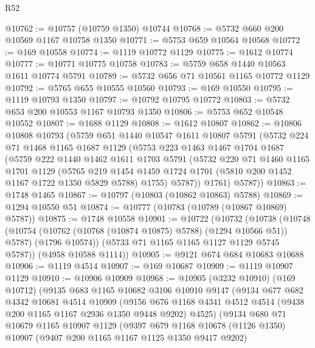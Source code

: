 \begin{lexlean}{R52}
\begin{coremodule}
@10762 := @10757 (@10759 @1350) @10744
@10768 := @5732 @660 @200 @10569 @1167 @10758 @1350
@10771 := @5753 @659 @10564 @10568
@10772 := @169 @10558
@10774 := @1119 @10772 @1129
@10775 := @1612 @10774
@10777 := @10771 @10775 @10758
@10783 := @5759 @658 @1440 @10563 @1611 @10774 @5791
@10789 := @5732 @656 @71 @10561 @1165 @10772 @1129
@10792 := @5765 @655 @10555 @10560
@10793 := @169 @10550
@10795 := @1119 @10793 @1350
@10797 := @10792 @10795 @10772
@10803 := @5732 @653 @200 @10553 @1167 @10793 @1350
@10806 := @5753 @652 @10548 @10552
@10807 := @1688 @1129
@10808 := @1612 @10807
@10862 := @10806
    @10808
    @10793
    (@5759
      @651
      @1440
      @10547
      @1611
      @10807
      @5791
      (@5732
        @224
        @71
        @1468
        @1165
        @1687
        @1129
        (@5753
          @223
          @1463
          @1467
          @1704
          @1687
          (@5759
            @222
            @1440
            @1462
            @1611
            @1703
            @5791
            (@5732
              @220
              @71
              @1460
              @1165
              @1701
              @1129
              (@5765
                @219
                @1454
                @1459
                @1724
                @1701
                (@5810 @200 @1452 @1167 @1722 @1350 @5829 @5788)
                @1755)
              @5787))
          @1761)
        @5787))
@10863 := @1748 @1465
@10867 := @10797 (@10803 (@10862 @10863) @5788)
@10869 := @1294 @10550 @51
@10874 := @10777 (@10783 (@10789 (@10867 @10869) @5787))
@10875 := @1748 @10558
@10901 := @10722
    (@10732
      (@10738
        (@10748
          (@10754 (@10762 (@10768 (@10874 @10875) @5788) (@1294 @10566 @51)) @5787)
          (@1796 @10574))
        (@5733 @71 @1165 @1165 @1127 @1129 @5745 @5787))
      (@4958 @10588 @1114))
@10905 := @9121 @674 @684 @10683 @10688
@10906 := @1119 @4514
@10907 := @169 @10687
@10909 := @1119 @10907 @1129
@10910 := @10906 @10909
@10968 := @10905
    (@3232 @10910)
    (@169 @10712)
    (@9135
      @683
      @1165
      @10682
      @3106
      @10910
      @9147
      (@9134
        @677
        @682
        @4342
        @10681
        @4514
        @10909
        (@9156 @676 @1168 @4341 @4512 @4514 (@9438 @200 @1165 @1167 @2936 @1350 @9448 @9202) @4525)
        (@9134
          @680
          @71
          @10679
          @1165
          @10907
          @1129
          (@9397
            @679
            @1168
            @10678
            (@1126 @1350)
            @10907
            (@9407 @200 @1165 @1167 @1125 @1350 @9417 @9202)

\end{coremodule}
\end{lexlean}
